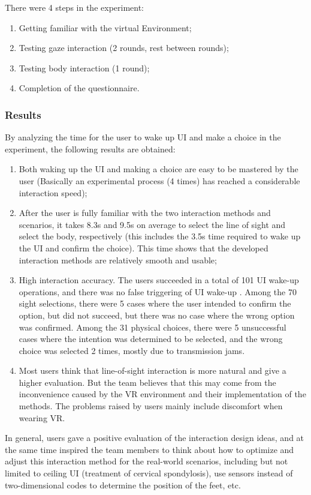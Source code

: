 There were 4 steps in the experiment:
\begin{enumerate}
    \item Getting familiar with the virtual Environment;
    \item Testing gaze interaction (2 rounds, rest between rounds);
    \item Testing body interaction (1 round);
    \item Completion of the questionnaire.
\end{enumerate}

\subsubsection{Results}

By analyzing the time for the user to wake up UI and make a choice in the experiment, the following results are obtained:
\begin{enumerate}
    \item Both waking up the UI and making a choice are easy to be mastered by the user (Basically an experimental process (4 times) has reached a considerable interaction speed);
    \item After the user is fully familiar with the two interaction methods and scenarios, it takes 8.3s and 9.5s on average to select the line of sight and select the body, respectively (this includes the 3.5s time required to wake up the UI and confirm the choice). This time shows that the developed interaction methods are relatively smooth and usable;
    \item High interaction accuracy.  The users succeeded in a total of 101 UI wake-up operations, and there was no false triggering of UI wake-up . Among the 70 sight selections, there were 5 cases where the user intended to confirm the option, but did not succeed, but there was no case where the wrong option was confirmed. Among the 31 physical choices, there were 5 unsuccessful cases where the intention was determined to be selected, and the wrong choice was selected 2 times, mostly due to transmission jams.
    \item Most users think that line-of-sight interaction is more natural and give a higher evaluation. But the team believes that this may come from the inconvenience caused by the VR environment and their implementation of the methods. The problems raised by users mainly include discomfort when wearing VR.
\end{enumerate}


In general, users gave a positive evaluation of the interaction design ideas, and at the same time inspired the team members to think about how to optimize and adjust this interaction method for the real-world scenarios, including but not limited to ceiling UI (treatment of cervical spondylosis), use sensors instead of two-dimensional codes to determine the position of the feet, etc.

